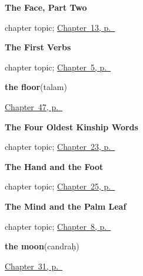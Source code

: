 \noindent\begin{minipage}[t]{\linewidth}
\raggedright
\textbf{The Face, Part Two}\par
\footnotesize chapter topic; \hyperref[ch:sa-face-nouns-2]{Chapter~13, p.~\pageref*{ch:sa-face-nouns-2}}
\end{minipage}\par\smallskip

\noindent\begin{minipage}[t]{\linewidth}
\raggedright
\textbf{The First Verbs}\par
\footnotesize chapter topic; \hyperref[ch:first-verbs]{Chapter~5, p.~\pageref*{ch:first-verbs}}
\end{minipage}\par\smallskip

\noindent\begin{minipage}[t]{\linewidth}
\raggedright
\textbf{the floor}\enspace\emph{}\enspace(talam)\par
\footnotesize \hyperref[ch:sa-parts-of-a-house]{Chapter~47, p.~\pageref*{ch:sa-parts-of-a-house}}
\end{minipage}\par\smallskip

\noindent\begin{minipage}[t]{\linewidth}
\raggedright
\textbf{The Four Oldest Kinship Words}\par
\footnotesize chapter topic; \hyperref[ch:sa-kinship]{Chapter~23, p.~\pageref*{ch:sa-kinship}}
\end{minipage}\par\smallskip

\noindent\begin{minipage}[t]{\linewidth}
\raggedright
\textbf{The Hand and the Foot}\par
\footnotesize chapter topic; \hyperref[ch:sa-body-more]{Chapter~25, p.~\pageref*{ch:sa-body-more}}
\end{minipage}\par\smallskip

\noindent\begin{minipage}[t]{\linewidth}
\raggedright
\textbf{The Mind and the Palm Leaf}\par
\footnotesize chapter topic; \hyperref[ch:sa-mind-verbs]{Chapter~8, p.~\pageref*{ch:sa-mind-verbs}}
\end{minipage}\par\smallskip

\noindent\begin{minipage}[t]{\linewidth}
\raggedright
\textbf{the moon}\enspace\emph{}\enspace(candraḥ)\par
\footnotesize \hyperref[ch:sa-sky]{Chapter~31, p.~\pageref*{ch:sa-sky}}
\end{minipage}\par\smallskip

